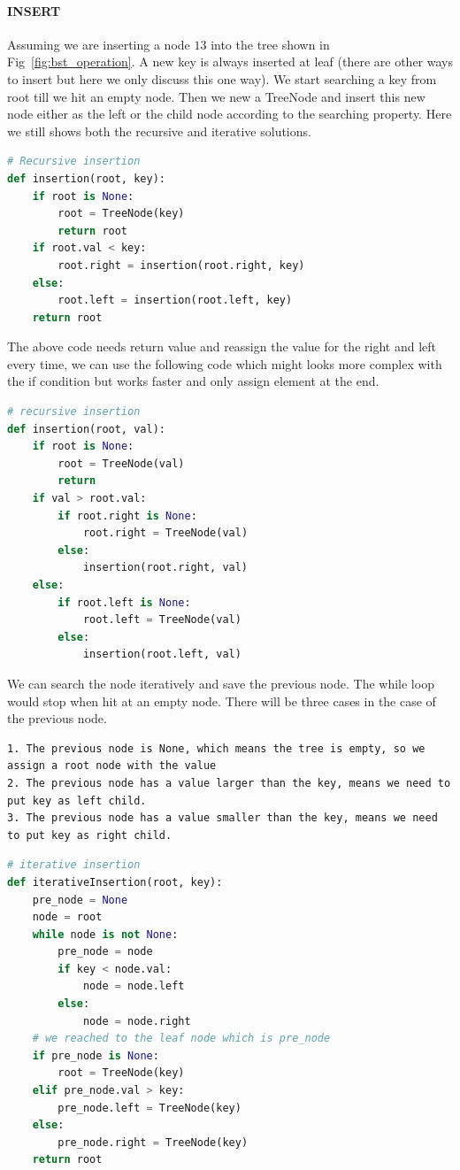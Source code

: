 \documentclass[../main.tex]{subfiles}
\begin{document}
\paragraph{INSERT}
Assuming we are inserting a node $13$ into the tree shown in Fig~\ref{fig:bst_operation}. A new key is always inserted at leaf (there are other ways to insert but here we only discuss this one way). We start searching a key from root till we hit an empty node. Then we new a TreeNode and insert this new node either as the left or the child node according to the searching property. Here we still shows both the recursive and iterative solutions.
\begin{lstlisting}[language = Python]
# Recursive insertion
def insertion(root, key):
    if root is None:
        root = TreeNode(key)
        return root
    if root.val < key:
        root.right = insertion(root.right, key)
    else:
        root.left = insertion(root.left, key)
    return root
\end{lstlisting}
The above code needs return value and reassign the value for the right and left every time, we can use the following code which might looks more complex with the if condition but works faster and only assign element at the end. 
\begin{lstlisting}[language=Python]
# recursive insertion
def insertion(root, val):
    if root is None:
        root = TreeNode(val)
        return 
    if val > root.val:
        if root.right is None:
            root.right = TreeNode(val)
        else:
            insertion(root.right, val)
    else:
        if root.left is None:
            root.left = TreeNode(val)
        else:
            insertion(root.left, val)
\end{lstlisting}
We can search the node iteratively and save the previous node. The while loop would stop when hit at an empty node.  There will be three cases in the case of the previous node. 
\begin{lstlisting}[numbers=none]
1. The previous node is None, which means the tree is empty, so we assign a root node with the value
2. The previous node has a value larger than the key, means we need to put key as left child.  
3. The previous node has a value smaller than the key, means we need to put key as right child.
\end{lstlisting}
\begin{lstlisting}[language = Python]
# iterative insertion
def iterativeInsertion(root, key):
    pre_node = None
    node = root
    while node is not None:
        pre_node = node
        if key < node.val:
            node = node.left
        else:
            node = node.right
    # we reached to the leaf node which is pre_node
    if pre_node is None:
        root = TreeNode(key)
    elif pre_node.val > key:
        pre_node.left = TreeNode(key)
    else:
        pre_node.right = TreeNode(key)
    return root
\end{lstlisting}
\end{document}
